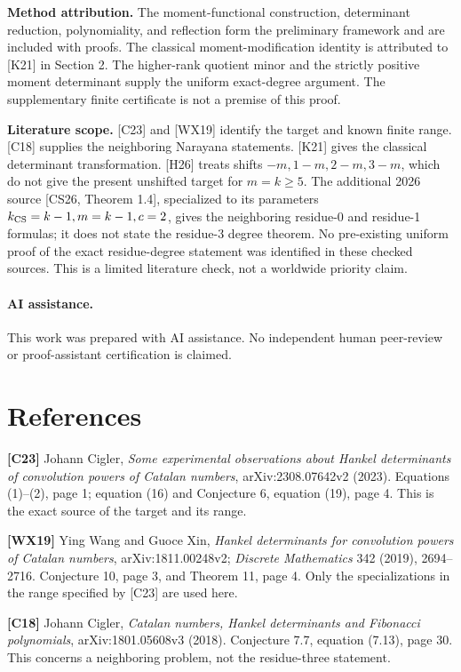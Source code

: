 \documentclass[
  11pt,
]{article}
\begin{document}
\textbf{Method attribution.} The moment-functional construction,
determinant reduction, polynomiality, and reflection form the preliminary
framework and are included with proofs. The classical moment-modification
identity is attributed to {[}K21{]} in Section 2. The higher-rank quotient
minor and the strictly positive moment determinant supply the uniform
exact-degree argument. The supplementary finite certificate is not a
premise of this proof.

\textbf{Literature scope.} {[}C23{]} and {[}WX19{]} identify the target
and known finite range. {[}C18{]} supplies the neighboring Narayana
statements. {[}K21{]} gives the classical determinant transformation.
{[}H26{]} treats shifts \(-m,1-m,2-m,3-m\), which do not give the
present unshifted target for \(m=k\ge5\). The additional 2026 source
{[}CS26, Theorem 1.4{]}, specialized to its parameters
\(k_{\rm CS}=k-1,m=k-1,c=2\), gives the neighboring residue-0 and
residue-1 formulas; it does not state the residue-3 degree theorem. No
pre-existing uniform proof of the exact residue-degree statement was
identified in these checked sources. This is a limited literature check,
not a worldwide priority claim.

\paragraph{AI assistance.} This work was prepared with AI assistance.
No independent human peer-review or proof-assistant certification is
claimed.

\section{References}\label{citation}
\begingroup\small\raggedright
\setlength{\parskip}{3pt}

\textbf{{[}C23{]}} Johann Cigler, \emph{Some experimental observations
about Hankel determinants of convolution powers of Catalan numbers},
arXiv:2308.07642v2 (2023). Equations (1)--(2), page 1; equation (16) and
Conjecture 6, equation (19), page 4. This is the exact source of the
target and its range.

\textbf{{[}WX19{]}} Ying Wang and Guoce Xin, \emph{Hankel determinants
for convolution powers of Catalan numbers}, arXiv:1811.00248v2;
\emph{Discrete Mathematics} 342 (2019), 2694--2716. Conjecture 10, page
3, and Theorem 11, page 4. Only the specializations in the range
specified by {[}C23{]} are used here.

\textbf{{[}C18{]}} Johann Cigler, \emph{Catalan numbers, Hankel
determinants and Fibonacci polynomials}, arXiv:1801.05608v3 (2018).
Conjecture 7.7, equation (7.13), page 30. This concerns a neighboring problem, not
the residue-three statement.
\end{document}

